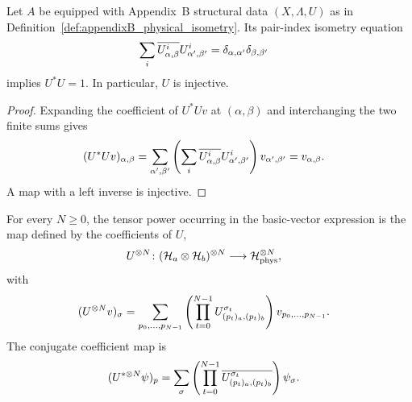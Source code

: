 \begin{lemma}
    \label{thm:appendixB_physical_isometry_left_inverse}
    \leanok
    Let $A$ be equipped with Appendix~B structural data $(X,\Lambda,U)$ as in
    Definition~\ref{def:appendixB_physical_isometry}. Its pair-index
    isometry equation
    \begin{align}
        \sum_i\overline{U^i_{\alpha,\beta}}
        U^i_{\alpha',\beta'}
         & =
        \delta_{\alpha,\alpha'}\delta_{\beta,\beta'}
        \notag
    \end{align}
    implies $U^*U=1$. In particular, $U$ is injective.
\end{lemma}

\begin{proof}
    \leanok
    Expanding the coefficient of $U^*Uv$ at $(\alpha,\beta)$ and interchanging
    the two finite sums gives
    \begin{align}
        (U^*Uv)_{\alpha,\beta}
         & =
        \sum_{\alpha',\beta'}
        \left(\sum_i\overline{U^i_{\alpha,\beta}}
        U^i_{\alpha',\beta'}\right)
        v_{\alpha',\beta'} =
        v_{\alpha,\beta}.
        \notag
    \end{align}
    A map with a left inverse is injective.
\end{proof}

\begin{definition}
    \label{def:appendixB_physical_isometry_tensor_power}
    \leanok
    For every $N\geq 0$, the tensor power occurring in the basic-vector
    expression \cite[Equation~(3.17)]{Cirac2016MPDO_arXiv} is the map defined
    by the coefficients of $U$,
    \begin{align}
        U^{\otimes N}\colon
        (\mathcal H_a\otimes\mathcal H_b)^{\otimes N}
         & \longrightarrow
        \mathcal H_{\mathrm{phys}}^{\otimes N},
        \notag
    \end{align}
    with
    \begin{align}
        (U^{\otimes N}v)_\sigma
         & =
        \sum_{p_0,\ldots,p_{N-1}}
        \left(\prod_{t=0}^{N-1}
        U^{\sigma_t}_{(p_t)_a,(p_t)_b}\right)
        v_{p_0,\ldots,p_{N-1}}.
        \notag
    \end{align}
    The conjugate coefficient map is
    \begin{align}
        (U^{*\otimes N}\psi)_p
         & =
        \sum_\sigma
        \left(\prod_{t=0}^{N-1}
        \overline{U^{\sigma_t}_{(p_t)_a,(p_t)_b}}\right)
        \psi_\sigma.
        \notag
    \end{align}
\end{definition}

